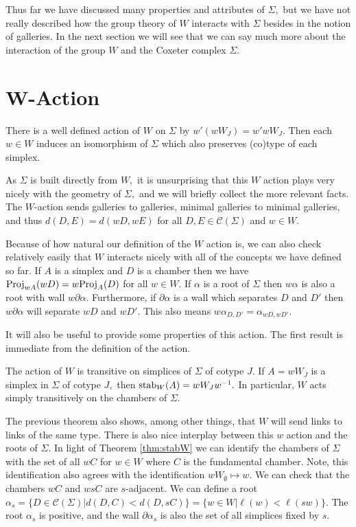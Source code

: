 \documentclass[class=book, crop=false,12 pt]{standalone}
\begin{document}
Thus far we have discussed many properties and attributes of $\Sigma,$ but we have not really described how the group theory of $W$ interacts with $\Sigma$ besides in the notion of galleries. In the next section we will see that we can say much more about the interaction of the group $W$ and the Coxeter complex $\Sigma.$

\section{W-Action}
\begin{prop}
	\label{prop:wact}
	There is a well defined action of $W$ on $\Sigma$ by $w'(wW_J)=w'wW_J.$ Then each $w\in W$ induces an isomorphism of $\Sigma$ which also preserves (co)type of each simplex.
\end{prop}

As $\Sigma$ is built directly from $W,$ it is unsurprising that this $W$ action plays very nicely with the geometry of $\Sigma,$ and we will briefly collect the more relevant facts. The $W$-action sends galleries to galleries, minimal galleries to minimal galleries, and thus $d(D,E)=d(wD,wE)$ for all $D,E\in \mathcal{C}(\Sigma)$ and $w\in W.$ 

Because of how natural our definition of the $W$ action is, we can also check relatively easily that $W$ interacts nicely with all of the concepts we have defined so far. If $A$ is a simplex and $D$ is a chamber then we have $\mathrm{Proj}_{wA}(wD)=w\mathrm{Proj}_{A}(D)$ for all $w\in W.$ If $\alpha$ is a root of $\Sigma$ then $w\alpha$ is also a root with wall $w\partial\alpha.$ Furthermore, if $\partial\alpha$ is a wall which separates $D$ and $D'$ then $w\partial\alpha$ will separate $wD$ and $wD'.$ This also means $w\alpha_{D,D'}=\alpha_{wD,wD'}.$ 

It will also be useful to provide some properties of this action. The first result is immediate from the definition of the action.
\begin{theorem}
	\label{thm:stabW}
	The action of $W$ is transitive on simplices of $\Sigma$ of cotype $J.$ If $A=wW_J$ is a simplex in $\Sigma$ of cotype $J,$ then $\mathrm{stab}_W(A)=wW_Jw^{-1}.$ In particular, $W$ acts simply transitively on the chambers of $\Sigma.$ 
\end{theorem}

The previous theorem also shows, among other things, that $W$ will send links to links of the same type. There is also nice interplay between this $w$ action and the roots of $\Sigma.$ In light of Theorem \ref{thm:stabW} we can identify the chambers of $\Sigma$ with the set of all $wC$ for $w\in W$ where $C$ is the fundamental chamber. Note, this identification also agrees with the identification $wW_\emptyset\mapsto w.$ We can check that the chambers $wC$ and $wsC$ are $s$-adjacent. We can define a root $\alpha_s=\{D\in \mathcal{C}(\Sigma)|d(D,C)<d(D,sC)\}=\{w\in W|\ell(w)<\ell(sw)\}.$ The root $\alpha_s$ is positive, and the wall $\partial\alpha_s$ is also the set of all simplices fixed by $s.$ 
\end{document}
